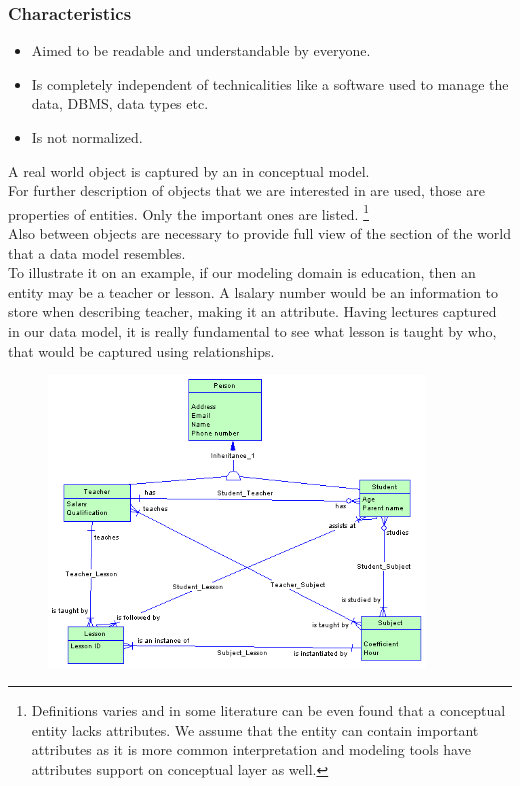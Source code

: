 \subsubsection{Characteristics}
\begin{itemize}
	\item Aimed to be readable and understandable by everyone.
	\item Is completely independent of technicalities like a software used to manage the data, DBMS, data types etc.
	\item Is not normalized.
\end{itemize}

A real world object is captured by an  in conceptual model. \\
For further description of objects that we are interested in  are used, those are properties of entities. Only the important ones are listed. \footnote{Definitions varies and in some literature can be even found that a conceptual entity lacks attributes. We assume that the entity can contain important attributes as it is more common interpretation and modeling tools have attributes support on conceptual layer as well.} \\
Also  between objects are necessary to provide full view of the section of the world that a data model resembles. \\

To illustrate it on an example, if our modeling domain is education, then an entity may be a teacher or lesson. 
A lsalary number would be an information to store when describing teacher, making it an attribute.
Having lectures captured in our data model, it is really fundamental to see what lesson is taught by who, that would be captured using relationships.

\begin{figure}[H]
	\centering
	\includegraphics[width=10cm]{../img/Conceptual_Model_PowerDesigner}
	\caption{\cite{ConceptualModelExample}}
\end{figure}

